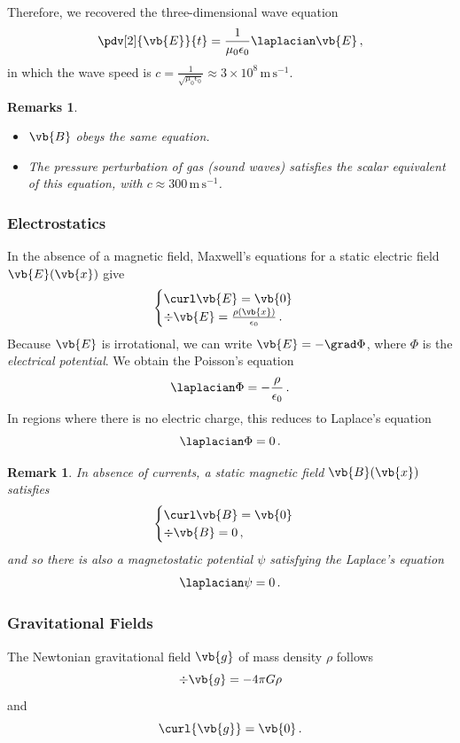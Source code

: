 \documentclass{article}
\theoremstyle{plain}\theoremheaderfont{\normalfont\itshape}\theorembodyfont{\rmfamily}\theoremseparator{.}\newtheorem*{rem}{Remark}\newtheorem*{ex}{Example}\newtheorem*{proof}{Proof}\newtheorem*{altp}{Alternative proof}
\theoremstyle{plain}\theoremheaderfont{\normalfont\bfseries}\theorembodyfont{\rmfamily}\theoremseparator{.}\newtheorem{thm}{Theorem}[section]\newtheorem{lem}[thm]{Lemma}\newtheorem{prop}[thm]{Proposition}\newtheorem*{cor}{Corollary}\newtheorem{defn}[thm]{Definition}\newtheorem{clm}[thm]{Claim}\newtheorem{clminproof}{Claim}
\theoremstyle{break}\theoremheaderfont{\normalfont\itshape}\theorembodyfont{\rmfamily}\theoremseparator{.\medskip}\newtheorem*{proofskip}{Proof}\newtheorem*{exs}{Examples}\newtheorem*{rems}{Remarks}
\theoremstyle{break}\theoremheaderfont{\normalfont\bfseries}\theorembodyfont{\rmfamily}\theoremseparator{.\medskip}\newtheorem{lemskip}[thm]{Lemma}\newtheorem{defnskip}[thm]{Definition}\newtheorem{propskip}[thm]{Proposition}\newtheorem{thmskip}[thm]{Theorem}
\numberwithin{equation}{section}
\begin{document}
	Therefore, we recovered the three-dimensional wave equation
	\[\pdv[2]{\vb{E}}{t}=\frac{1}{\mu_0\epsilon_0}\laplacian\vb{E}\,,\]
	in which the wave speed is \(c=\frac{1}{\sqrt{\mu_0\epsilon_0}}\approx3\times10^8\,\text{m}\,\text{s}^{-1}\).
	
	\begin{rems}
		\begin{itemize}[topsep=0pt]
			\item \(\vb{B}\) obeys the same equation.
			\item The pressure perturbation of gas (sound waves) satisfies the scalar equivalent of this equation, with \(c\approx 300\,\text{m}\,\text{s}^{-1}\).
		\end{itemize}
	\end{rems}
	
	\subsubsection{Electrostatics}
	In the absence of a magnetic field, Maxwell's equations for a static electric field \(\vb{E}(\vb{x})\) give
	\[\begin{cases}
		\curl\vb{E}=\vb{0}\\
		\div\vb{E}=\frac{\rho(\vb{x})}{\epsilon_0}\,.
	\end{cases}\]
	Because \(\vb{E}\) is irrotational, we can write \(\vb{E}=-\grad\Phi\), where \(\Phi\) is the \textit{electrical potential}. We obtain the Poisson's equation
	\[\laplacian\Phi=-\frac{\rho}{\epsilon_0}\,.\]
	In regions where there is no electric charge, this reduces to Laplace's equation
	\[\laplacian\Phi=0\,.\]

	\begin{rem}
		In absence of currents, a static magnetic field \(\vb{B}(\vb{x})\) satisfies
		\[\begin{cases}
			\curl\vb{B}=\vb{0}\\
			\div\vb{B}=0\,,
		\end{cases}\]
		and so there is also a \textit{magnetostatic potential} \(\psi\) satisfying the Laplace's equation
		\[\laplacian\psi=0\,.\]
	\end{rem}
	
	\subsubsection{Gravitational Fields}
	The Newtonian gravitational field \(\vb{g}\) of mass density \(\rho\) follows
	\[\div{\vb{g}}=-4\pi G\rho\]
	and
	\[\curl{\vb{g}}=\vb{0}\,.\]
	
\end{document}
